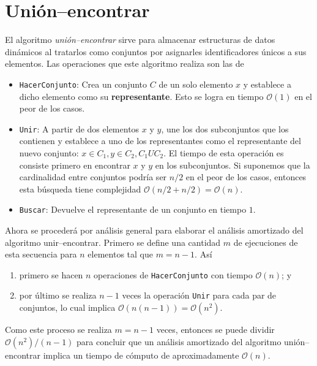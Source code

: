 \documentclass[paper=leter, fontsize=11pt]{scrartcl}
\numberwithin{equation}{section}		%
\numberwithin{figure}{section}			%
\numberwithin{table}{section}				%
\begin{document}
\section{Unión--encontrar}
El algoritmo \textit{unión--encontrar} sirve para almacenar estructuras de datos dinámicos al tratarlos como conjuntos por asignarles identificadores únicos a sus elementos. Las operaciones que este algoritmo realiza son las de 
\begin{itemize}
    \item \texttt{HacerConjunto}: Crea un conjunto $C$ de un solo elemento $x$ y establece a dicho elemento como su \textbf{representante}. Esto se logra en tiempo $\mathcal{O}(1)$ en el peor de los casos.
    \item \texttt{Unir}: A partir de dos elementos $x$ y $y$, une los dos subconjuntos que los contienen y establece a uno de los representantes como el representante del nuevo conjunto: $x \in C_1, y \in C_2, C_1 U C_2$. El tiempo de esta operación es consiste primero en encontrar $x$ y $y$ en los subconjuntos. Si suponemos que la cardinalidad entre conjuntos podría ser $n/2$ en el peor de los casos, entonces esta búsqueda tiene complejidad $\mathcal{O}(n / 2 + n / 2) = \mathcal{O}(n)$.
    \item \texttt{Buscar}: Devuelve el representante de un conjunto en tiempo $\mathcal{1}$.
\end{itemize}

Ahora se procederá por análisis general para elaborar el análisis amortizado del algoritmo unir--encontrar. Primero se define una cantidad $m$ de ejecuciones de esta secuencia para $n$ elementos tal que $m = n - 1$. Así
\begin{enumerate}
    \item primero se hacen $n$ operaciones de \texttt{HacerConjunto} con tiempo $\mathcal{O}(n)$; y
    \item por último se realiza $n-1$ veces la operación \texttt{Unir} para cada par de conjuntos, lo cual implica $\mathcal{O}(n (n -1)) = \mathcal{O}(n^2)$.
\end{enumerate}
Como este proceso se realiza $m = n - 1$ veces, entonces se puede dividir $\mathcal{O}(n^2) / (n - 1)$ para concluir que un análisis amortizado del algoritmo unión--encontrar implica un tiempo de cómputo de aproximadamente $\mathcal{O}(n)$.



\end{document}
